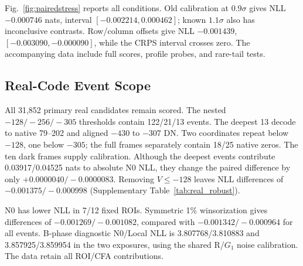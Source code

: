 \documentclass[10pt,twocolumn,journal]{IEEEtran}
\begin{document}
Fig.~\ref{fig:pairedstress} reports all conditions. Old calibration at $0.9\sigma$ gives NLL $-0.000746$ nats, interval $[-0.002214,0.000462]$; known $1.1\sigma$ also has inconclusive contrasts. Row/column offsets give NLL $-0.001439$, $[-0.003090,-0.000090]$, while the CRPS interval crosses zero. The accompanying data include full scores, profile probes, and rare-tail tests.

\subsection{Real-Code Event Scope}\label{sec:realcode}
All 31,852 primary real candidates remain scored. The nested $-128/-256/-305$ thresholds contain 122/21/13 events. The deepest 13 decode to native 79--202 and aligned $-430$ to $-307$ DN. Two coordinates repeat below $-128$, one below $-305$; the full frames separately contain 18/25 native zeros. The ten dark frames supply calibration. Although the deepest events contribute 0.03917/0.04525 nats to absolute N0 NLL, they change the paired difference by only $+0.0000040/-0.0000083$. Removing $V\leq-128$ leaves NLL differences of $-0.001375/-0.000998$ (Supplementary Table~\ref{tab:real_robust}).

N0 has lower NLL in 7/12 fixed ROIs. Symmetric 1\% winsorization gives differences of $-0.001269/-0.001082$, compared with $-0.001342/-0.000964$ for all events. B-phase diagnostic N0/Local NLL is 3.807768/3.810883 and 3.857925/3.859954 in the two exposures, using the shared R/$G_1$ noise calibration. The data retain all ROI/CFA contributions.
\end{document}
